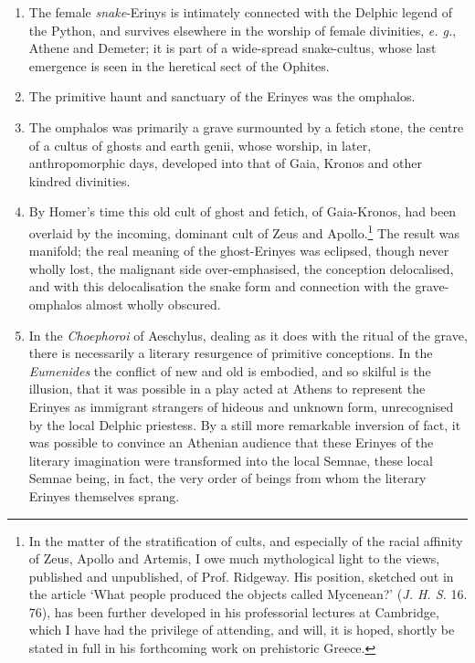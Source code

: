 \documentclass[a4paper, 11pt, oneside, polutonikogreek, english]{article}
\begin{document}
\begin{enumerate}
    \item The female \emph{snake}-Erinys is intimately connected with the Delphic legend of the Python, and survives elsewhere in the worship of female divinities, \emph{e. g.}, Athene and Demeter; it is part of a wide-spread snake-cultus, whose last emergence is seen in the heretical sect of the Ophites.

    \item The primitive haunt and sanctuary of the Erinyes was the omphalos.

    \item The omphalos was primarily a grave surmounted by a fetich stone, the centre of a cultus of ghosts and earth genii, whose worship, in later, anthropomorphic days, developed into that of Gaia, Kronos and other kindred divinities.

    \item By Homer's time this old cult of ghost and fetich, of Gaia-Kronos, had been overlaid by the incoming, dominant cult of Zeus and Apollo.\footnote{In the matter of the stratification of cults, and especially of the racial affinity of Zeus, Apollo and Artemis, I owe much mythological light to the views, published and unpublished, of Prof. Ridgeway. His position, sketched out in the article `What people produced the objects called Mycenean?' (\emph{J. H. S.} 16. 76), has been further developed in his professorial lectures at Cambridge, which I have had the privilege of attending, and will, it is hoped, shortly be stated in full in his forthcoming work on prehistoric Greece.} The result was manifold; the real meaning of the ghost-Erinyes was eclipsed, though never wholly lost, the malignant side over-emphasised, the conception delocalised, and with this delocalisation the snake form and connection with the grave-omphalos almost wholly obscured.

    \item In the \emph{Choephoroi} of Aeschylus, dealing as it does with the ritual of the grave, there is necessarily a literary resurgence of primitive conceptions. In the \emph{Eumenides} the conflict of new and old is embodied, and so skilful is the illusion, that it was possible in a play acted at Athens to represent the Erinyes as immigrant strangers of hideous and unknown form, unrecognised by the local Delphic priestess. By a still more remarkable inversion of fact, it was possible to convince an Athenian audience that these Erinyes of the literary imagination were transformed into the local Semnae, these local Semnae being, in fact, the very order of beings from whom the literary Erinyes themselves sprang.
\end{enumerate}
\clearpage
\end{document}
